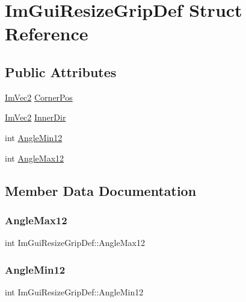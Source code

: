 \hypertarget{struct_im_gui_resize_grip_def}{}\section{Im\+Gui\+Resize\+Grip\+Def Struct Reference}
\label{struct_im_gui_resize_grip_def}
\subsection*{Public Attributes}
\begin{DoxyCompactItemize}
\item 
\hyperlink{struct_im_vec2}{Im\+Vec2} \hyperlink{struct_im_gui_resize_grip_def_ab8ffa45cb1ef3e825f5817b60c1555aa}{Corner\+Pos}
\item 
\hyperlink{struct_im_vec2}{Im\+Vec2} \hyperlink{struct_im_gui_resize_grip_def_a82a1367d835f206fc24b3f114c60f897}{Inner\+Dir}
\item 
int \hyperlink{struct_im_gui_resize_grip_def_a5b335b7be8f517e38c56a5fd8e01d54c}{Angle\+Min12}
\item 
int \hyperlink{struct_im_gui_resize_grip_def_a697cdecca28177e275ce7ec38ef8e802}{Angle\+Max12}
\end{DoxyCompactItemize}


\subsection{Member Data Documentation}
\hypertarget{struct_im_gui_resize_grip_def_a697cdecca28177e275ce7ec38ef8e802}{}\label{struct_im_gui_resize_grip_def_a697cdecca28177e275ce7ec38ef8e802} 
\subsubsection{\texorpdfstring{Angle\+Max12}{AngleMax12}}
{\footnotesize\ttfamily int Im\+Gui\+Resize\+Grip\+Def\+::\+Angle\+Max12}

\hypertarget{struct_im_gui_resize_grip_def_a5b335b7be8f517e38c56a5fd8e01d54c}{}\label{struct_im_gui_resize_grip_def_a5b335b7be8f517e38c56a5fd8e01d54c} 
\subsubsection{\texorpdfstring{Angle\+Min12}{AngleMin12}}
{\footnotesize\ttfamily int Im\+Gui\+Resize\+Grip\+Def\+::\+Angle\+Min12}

